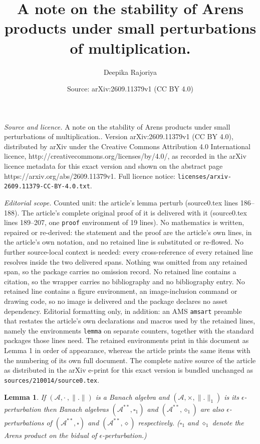 \documentclass[10pt,a4paper]{amsart}
\title{A note on the stability of Arens products under small perturbations of multiplication.}
\author{Deepika Rajoriya}
\date{Source: arXiv:2609.11379v1 (CC BY 4.0)}
\newtheorem{lemma}{Lemma}
\begin{document}
\maketitle

\noindent\emph{Source and licence.} A note on the stability of Arens products under small perturbations of multiplication.. Version arXiv:2609.11379v1 (CC BY 4.0), distributed by arXiv under the Creative Commons Attribution 4.0 International licence, http://creativecommons.org/licenses/by/4.0/, as recorded in the arXiv licence metadata for this exact version and shown on the abstract page https://arxiv.org/abs/2609.11379v1. Full licence notice: \texttt{licenses/arxiv-2609.11379-CC-BY-4.0.txt}.\par\smallskip

\noindent\textit{Editorial scope.} Counted unit: the article's lemma perturb (source0.tex lines 186--188). The article's complete original proof of it is delivered with it (source0.tex lines 189--207, one \texttt{proof} environment of 19 lines). No mathematics is written, repaired or re-derived: the statement and the proof are the article's own lines, in the article's own notation, and no retained line is substituted or re-flowed.  No further source-local context is needed: every cross-reference of every retained line resolves inside the two delivered spans.  Nothing was omitted from any retained span, so the package carries no omission record.  No retained line contains a citation, so the wrapper carries no bibliography and no bibliography entry.  No retained line contains a figure environment, an image-inclusion command or drawing code, so no image is delivered and the package declares no asset dependency.  Editorial formatting only, in addition: an AMS \texttt{amsart} preamble that restates the article's own declarations and macros used by the retained lines, namely the environments \texttt{lemma} on separate counters, together with the standard packages those lines need.  The retained environments print in this document as Lemma 1 in order of appearance, whereas the article prints the same items with the numbering of its own full document.  The complete native source of the article as distributed in the arXiv e-print for this exact version is bundled unchanged as \texttt{sources/210014/source0.tex}.
 \begin{lemma}\label{perturb}
 	If $(\mathcal A, \cdot~, \|.\|)$ is a Banach algebra and $(\mathcal A, \times, \|.\|_1)$ is its $\epsilon$- perturbation then Banach algebras $(\mathcal A^{**},\square_1)$ and $(\mathcal A^{**}, \diamond_1)$ are also $\epsilon$-perturbations of $(\mathcal A^{**},\square )$ and $(\mathcal A^{**},\diamond)$ respectively. ($\square_1$ and $\diamond_1$ denote the Arens product on the bidual of $\epsilon$-perturbation.)
 \end{lemma}
\end{document}
